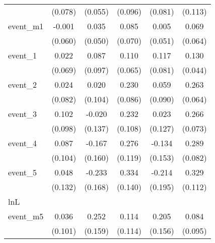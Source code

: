 {\begin{tabular}{l*{5}{c}}
            &     (0.078)         &     (0.055)         &     (0.096)         &     (0.081)         &     (0.113)         \\
[1em]
event\_m1    &      -0.001         &       0.035         &       0.085         &       0.005         &       0.069         \\
            &     (0.060)         &     (0.050)         &     (0.070)         &     (0.051)         &     (0.064)         \\
[1em]
event\_1     &       0.022         &       0.087         &       0.110         &       0.117         &       0.130\sym{**} \\
            &     (0.069)         &     (0.097)         &     (0.065)         &     (0.081)         &     (0.044)         \\
[1em]
event\_2     &       0.024         &       0.020         &       0.230\sym{**} &       0.059         &       0.263\sym{***}\\
            &     (0.082)         &     (0.104)         &     (0.086)         &     (0.090)         &     (0.064)         \\
[1em]
event\_3     &       0.102         &      -0.020         &       0.232\sym{*}  &       0.023         &       0.266\sym{***}\\
            &     (0.098)         &     (0.137)         &     (0.108)         &     (0.127)         &     (0.073)         \\
[1em]
event\_4     &       0.087         &      -0.167         &       0.276\sym{*}  &      -0.134         &       0.289\sym{***}\\
            &     (0.104)         &     (0.160)         &     (0.119)         &     (0.153)         &     (0.082)         \\
[1em]
event\_5     &       0.048         &      -0.233         &       0.334\sym{*}  &      -0.214         &       0.329\sym{**} \\
            &     (0.132)         &     (0.168)         &     (0.140)         &     (0.195)         &     (0.112)         \\
\hline
lnL         &                     &                     &                     &                     &                     \\
event\_m5    &       0.036         &       0.252         &       0.114         &       0.205         &       0.084         \\
            &     (0.101)         &     (0.159)         &     (0.114)         &     (0.156)         &     (0.095)         \\

\end{tabular}}
